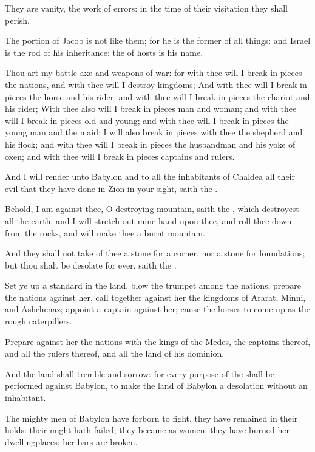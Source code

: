 \Verse They are vanity, the work of errors: in the time of their visitation they shall perish.

\Verse The portion of Jacob is not like them; for he is the former of all things: and Israel is the rod of his inheritance: the \LORD of hosts is his name.

\Verse Thou art my battle axe and weapons of war: for with thee will I break in pieces the nations, and with thee will I destroy kingdoms; \Verse And with thee will I break in pieces the horse and his rider; and with thee will I break in pieces the chariot and his rider; \Verse With thee also will I break in pieces man and woman; and with thee will I break in pieces old and young; and with thee will I break in pieces the young man and the maid; \Verse I will also break in pieces with thee the shepherd and his flock; and with thee will I break in pieces the husbandman and his yoke of oxen; and with thee will I break in pieces captains and rulers.

\Verse And I will render unto Babylon and to all the inhabitants of Chaldea all their evil that they have done in Zion in your sight, saith the \LORD.

\Verse Behold, I am against thee, O destroying mountain, saith the \LORD, which destroyest all the earth: and I will stretch out mine hand upon thee, and roll thee down from the rocks, and will make thee a burnt mountain.

\Verse And they shall not take of thee a stone for a corner, nor a stone for foundations; but thou shalt be desolate for ever, saith the \LORD.

\Verse Set ye up a standard in the land, blow the trumpet among the nations, prepare the nations against her, call together against her the kingdoms of Ararat, Minni, and Ashchenaz; appoint a captain against her; cause the horses to come up as the rough caterpillers.

\Verse Prepare against her the nations with the kings of the Medes, the captains thereof, and all the rulers thereof, and all the land of his dominion.

\Verse And the land shall tremble and sorrow: for every purpose of the \LORD shall be performed against Babylon, to make the land of Babylon a desolation without an inhabitant.

\Verse The mighty men of Babylon have forborn to fight, they have remained in their holds: their might hath failed; they became as women: they have burned her dwellingplaces; her bars are broken.

